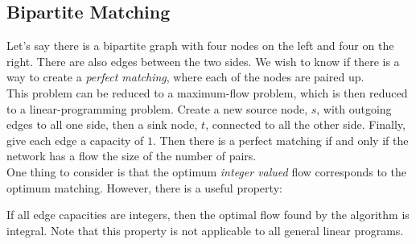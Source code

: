 \subsection{Bipartite Matching}
Let's say there is a bipartite graph with four nodes on the left and four on the right.
There are also edges between the two sides.
We wish to know if there is a way to create a \textit{perfect matching}, where each of the nodes are paired up.\\
This problem can be reduced to a maximum-flow problem, which is then reduced to a linear-programming problem.
Create a new source node, $s$, with outgoing edges to all one side, then a sink node, $t$, connected to all the other side.
Finally, give each edge a capacity of $1$.
Then there is a perfect matching if and only if the network has a flow the size of the number of pairs.\\
One thing to consider is that the optimum \textit{integer valued} flow corresponds to the optimum matching.
However, there is a useful property:
\begin{property}
  If all edge capacities are integers, then the optimal flow found by the algorithm is integral.
  Note that this property is not applicable to all general linear programs.
\end{property}

